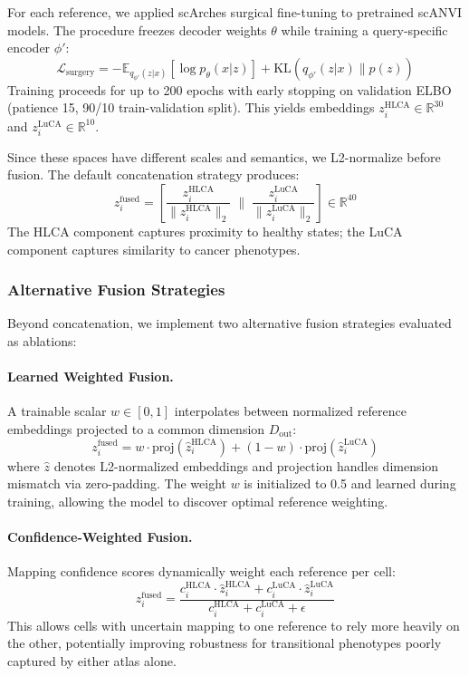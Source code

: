 For each reference, we applied scArches surgical fine-tuning to pretrained scANVI models. The procedure freezes decoder weights $\theta$ while training a query-specific encoder $\phi'$:
\begin{equation}
    \mathcal{L}_{\text{surgery}} = -\mathbb{E}_{q_{\phi'}(z|x)}[\log p_\theta(x|z)] + \text{KL}(q_{\phi'}(z|x) \| p(z))
\end{equation}
Training proceeds for up to 200 epochs with early stopping on validation ELBO (patience 15, 90/10 train-validation split). This yields embeddings $z_i^{\text{HLCA}} \in \mathbb{R}^{30}$ and $z_i^{\text{LuCA}} \in \mathbb{R}^{10}$.

Since these spaces have different scales and semantics, we L2-normalize before fusion. The default concatenation strategy produces:
\begin{equation}
    z_i^{\text{fused}} = \left[ \frac{z_i^{\text{HLCA}}}{\|z_i^{\text{HLCA}}\|_2} \;\Big\|\; \frac{z_i^{\text{LuCA}}}{\|z_i^{\text{LuCA}}\|_2} \right] \in \mathbb{R}^{40}
\end{equation}
The HLCA component captures proximity to healthy states; the LuCA component captures similarity to cancer phenotypes.

\subsubsection{Alternative Fusion Strategies}

Beyond concatenation, we implement two alternative fusion strategies evaluated as ablations:

\paragraph{Learned Weighted Fusion.} A trainable scalar $w \in [0,1]$ interpolates between normalized reference embeddings projected to a common dimension $D_{\text{out}}$:
\begin{equation}
    z_i^{\text{fused}} = w \cdot \text{proj}(\hat{z}_i^{\text{HLCA}}) + (1-w) \cdot \text{proj}(\hat{z}_i^{\text{LuCA}})
\end{equation}
where $\hat{z}$ denotes L2-normalized embeddings and projection handles dimension mismatch via zero-padding. The weight $w$ is initialized to 0.5 and learned during training, allowing the model to discover optimal reference weighting.

\paragraph{Confidence-Weighted Fusion.} Mapping confidence scores dynamically weight each reference per cell:
\begin{equation}
    z_i^{\text{fused}} = \frac{c_i^{\text{HLCA}} \cdot \hat{z}_i^{\text{HLCA}} + c_i^{\text{LuCA}} \cdot \hat{z}_i^{\text{LuCA}}}{c_i^{\text{HLCA}} + c_i^{\text{LuCA}} + \epsilon}
\end{equation}
This allows cells with uncertain mapping to one reference to rely more heavily on the other, potentially improving robustness for transitional phenotypes poorly captured by either atlas alone.

